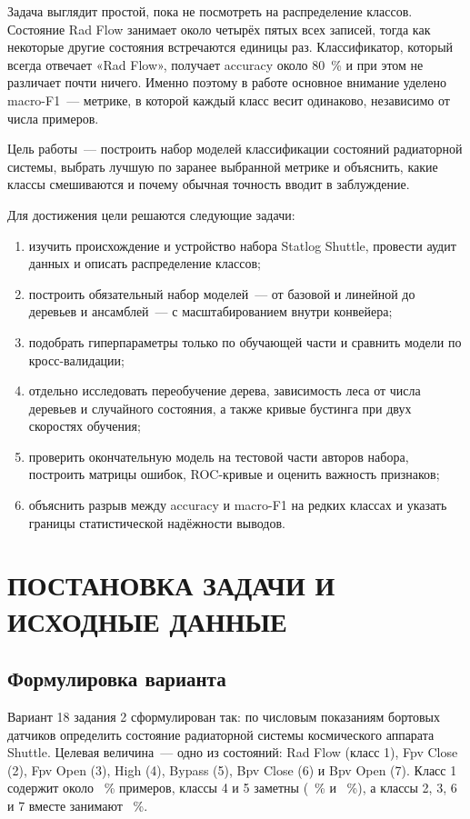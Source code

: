 \documentclass[14pt,a4paper]{extarticle}
\begin{document}
Задача выглядит простой, пока не посмотреть на распределение классов.
Состояние Rad Flow занимает около четырёх пятых всех записей, тогда как
некоторые другие состояния встречаются единицы раз. Классификатор, который
всегда отвечает «Rad Flow», получает accuracy около 80~\% и при этом
не различает почти ничего. Именно поэтому в работе основное внимание
уделено macro-F1~--- метрике, в которой каждый класс весит одинаково,
независимо от числа примеров.

Цель работы~--- построить набор моделей классификации состояний
радиаторной системы, выбрать лучшую по заранее выбранной метрике и
объяснить, какие классы смешиваются и почему обычная точность вводит
в заблуждение.

Для достижения цели решаются следующие задачи:
\begin{enumerate}
  \item изучить происхождение и устройство набора Statlog Shuttle,
  провести аудит данных и описать распределение классов;
  \item построить обязательный набор моделей~--- от базовой и линейной
  до деревьев и ансамблей~--- с масштабированием внутри конвейера;
  \item подобрать гиперпараметры только по обучающей части и сравнить
  модели по кросс-валидации;
  \item отдельно исследовать переобучение дерева, зависимость леса
  от числа деревьев и случайного состояния, а также кривые бустинга
  при двух скоростях обучения;
  \item проверить окончательную модель на тестовой части авторов набора,
  построить матрицы ошибок, ROC-кривые и оценить важность признаков;
  \item объяснить разрыв между accuracy и macro-F1 на редких классах
  и указать границы статистической надёжности выводов.
\end{enumerate}

\section{ПОСТАНОВКА ЗАДАЧИ И ИСХОДНЫЕ ДАННЫЕ}

\subsection{Формулировка варианта}

Вариант 18 задания 2 сформулирован так: по числовым показаниям бортовых
датчиков определить состояние радиаторной системы космического аппарата
Shuttle. Целевая величина~--- одно из \NClasses{} состояний: Rad Flow
(класс 1), Fpv Close (2), Fpv Open (3), High (4), Bypass (5), Bpv Close (6)
и Bpv Open (7). Класс 1 содержит около \ShareMajorTrain~\% примеров,
классы 4 и 5 заметны (\ShareClassFourTrain~\% и \ShareClassFiveTrain~\%),
а классы 2, 3, 6 и 7 вместе занимают \ShareMinorTrain~\%.
\end{document}
